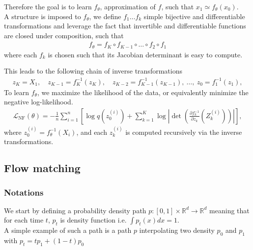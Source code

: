 \documentclass{article}
\begin{document}
Therefore the goal is to learn \(f_\theta\), approximation of \(f\), such that \(x_1 \simeq f_\theta(x_0)\). \\
A structure is imposed to $f_\theta$, we define $f_1\ldots f_k$ simple bijective and differentiable transformations and leverage the fact that invertible and differentiable functions are closed under composition, such that
\begin{align}
    f_\theta = f_K\circ f_{K-1}\circ\ldots\circ f_2\circ f_1
\end{align}
where each \( f_k \) is chosen such that its Jacobian determinant is easy to compute.

\begin{comment}
There is then, 
\begin{align}
    X_0\sim p_0=q, \quad f_1(X_0) = X_1 \implies X_1\sim p_1,\quad f(X_1)=X_2 \ldots f(X_{k-1})=X_k \sim p_k = \hat{p} \simeq p
\end{align}
\end{comment}
This leads to the following chain of inverse transformations
\begin{align}
    z_K = X_1,\quad z_{K-1} = f_K^{-1}(z_K),\quad z_{K-2} = f_{K-1}^{-1}(z_{K-1}),\ \dots,\ z_0 = f_1^{-1}(z_1),
\end{align}
To learn \(f_\theta\), we maximize the likelihood of the data, or equivalently minimize the negative log-likelihood.
\begin{align}
    \mathcal{L}_\text{NF}(\theta) 
    = -\frac{1}{n} \sum_{i=1}^n \left[ \log q(z_0^{(i)}) + \sum_{k=1}^K \log \left| \det \left( \frac{\partial f_k^{-1}}{\partial z_{k}}(Z_k^{(i)}) \right) \right| \right],
\end{align}
where \( z_0^{(i)} = f_\theta^{-1}(X_i) \), and each \( z_k^{(i)} \) is computed recursively via the inverse transformations.


\subsection{Flow matching}
\subsubsection{Notations}
We start by defining a probability density path \(p:[0,1]\times\mathbb{R}^d\rightarrow\mathbb{R}^d\) meaning that for each time \(t\), \(p_t\) is density function i.e. \(\int p_t(x)dx=1\).\\
A simple example of such a path is a path \(p\) interpolating two density \(p_0\) and \(p_1\) with \(p_t=tp_1+(1-t)p_0\)
\end{document}
